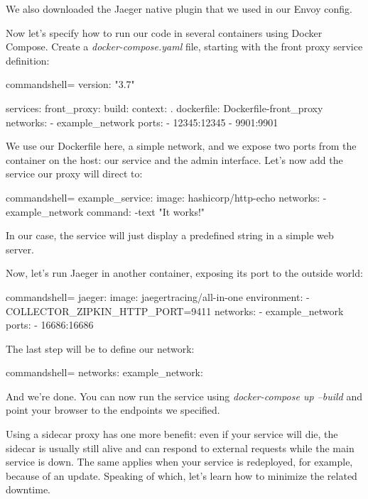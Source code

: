 We also downloaded the Jaeger native plugin that we used in our Envoy config.

Now let's specify how to run our code in several containers using Docker Compose. Create a \textit{docker-compose.yaml} file, starting with the front proxy service definition:


\begin{tcblisting}{commandshell={}}
version: "3.7"

services:
  front_proxy:
    build:
      context: .
      dockerfile: Dockerfile-front_proxy
    networks:
      - example_network
    ports:
      - 12345:12345
      - 9901:9901
\end{tcblisting}

We use our Dockerfile here, a simple network, and we expose two ports from the container on the host: our service and the admin interface. Let's now add the service our proxy will direct to:


\begin{tcblisting}{commandshell={}}
example_service:
  image: hashicorp/http-echo
  networks:
    - example_network
  command: -text "It works!"

\end{tcblisting}

In our case, the service will just display a predefined string in a simple web server.

Now, let's run Jaeger in another container, exposing its port to the outside world:


\begin{tcblisting}{commandshell={}}
jaeger:
  image: jaegertracing/all-in-one
  environment:
    - COLLECTOR_ZIPKIN_HTTP_PORT=9411
  networks:
    - example_network
  ports:
    - 16686:16686

\end{tcblisting}

The last step will be to define our network:

\begin{tcblisting}{commandshell={}}
  networks:
    example_network: {}

\end{tcblisting}

And we're done. You can now run the service using \textit{docker-compose up --build} and point your browser to the endpoints we specified.

Using a sidecar proxy has one more benefit: even if your service will die, the sidecar is usually still alive and can respond to external requests while the main service is down. The same applies when your service is redeployed, for example, because of an update. Speaking of which, let's learn how to minimize the related downtime.


